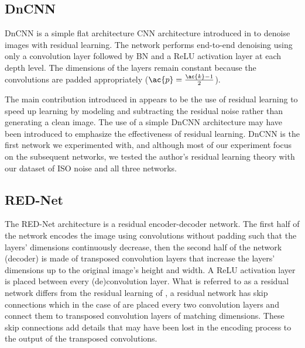 \subsection{DnCNN}
DnCNN is a simple flat architecture \ac{CNN} architecture introduced in \cite{dncnn} to denoise images with residual learning. The network performs end-to-end denoising using only a convolution layer followed by \ac{BN} and a \ac{ReLU} activation layer at each depth level. The dimensions of the layers remain constant because the convolutions are padded appropriately ($\ac{p}={\ac{k}-1\over{2}}$). %

The main contribution introduced in \cite{dncnn} appears to be the use of residual learning to speed up learning by modeling and subtracting the residual noise rather than generating a clean image. The use of a simple DnCNN architecture may have been introduced to emphasize the effectiveness of residual learning. DnCNN is the first network we experimented with, and although most of our experiment focus on the subsequent networks, we tested the author's residual learning theory with our dataset of ISO noise and all three networks.
\subsection{RED-Net}
The \ac{RED-Net} architecture is a residual encoder-decoder network. The first half of the network encodes the image using convolutions without padding such that the layers' dimensions continuously decrease, then the second half of the network (decoder) is made of transposed convolution layers that increase the layers' dimensions up to the original image's height and width. A \ac{ReLU} activation layer is placed between every (de)convolution layer. What is referred to as a residual network differs from the residual learning of \cite{dncnn}, a residual network has skip connections which in the case of \cite{rednet} are placed every two convolution layers and connect them to transposed convolution layers of matching dimensions. These skip connections add details that may have been lost in the encoding process to the output of the transposed convolutions. 

